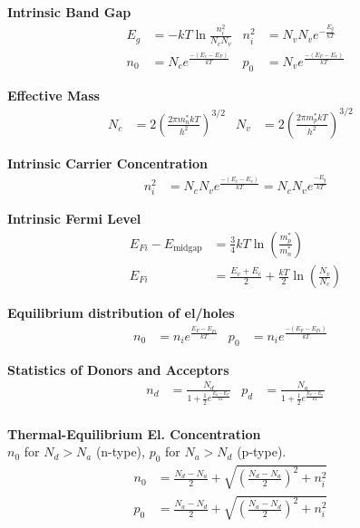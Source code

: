 \documentclass[a4paper, fontsize=8pt, landscape, DIV=1]{scrartcl}
\begin{document}
\begin{multicols*}{4}
    \textbf{Intrinsic Band Gap} \\
      \begin{align*}
        E_g &= -kT\ln\frac{n_i^2}{N_c N_v} &
        n_i^2 &= N_v N_v e^{-\frac{E_g}{kT}} \\
        n_0 &= N_ce^{\frac{-(E_c-E_F)}{kT}} &
        p_0 &= N_ve^{\frac{-(E_F-E_v)}{kT}}
      \end{align*}

    \textbf{Effective Mass} \\
      \begin{align*}
        N_c &= 2\left(\frac{2\pi m_n^*kT}{h^2}\right)^{3/2} &
        N_v &= 2\left(\frac{2\pi m_p^*kT}{h^2}\right)^{3/2} &
      \end{align*}

    \textbf{Intrinsic Carrier Concentration} \\
      \begin{align*}
        n_i^2 &= N_cN_ve^{\frac{-(E_c-E_v)}{kT}} = N_cN_ve^{\frac{-E_g}{kT}}
      \end{align*}

    \textbf{Intrinsic Fermi Level} \\
      \begin{align*}
        E_{Fi} - E_{\text{midgap}} &= \frac{3}{4}kT\ln\left(\frac{m_p^*}{m_n^*}\right) \\
        E_{Fi} &= \frac{E_v+E_c}{2} + \frac{kT}{2}\ln\left(\frac{N_v}{N_c}\right)
      \end{align*}

    \textbf{Equilibrium distribution of el/holes} \\
      \begin{align*}
        n_0 &= n_i e^{\frac{E_F-E_{Fi}}{kT}} &
        p_0 &= n_i e^{\frac{-(E_F-E_{Fi})}{kT}} &
      \end{align*}

    \textbf{Statistics of Donors and Acceptors} \\
      \begin{align*}
        n_d &= \frac{N_d}{1+\frac{1}{2}e^{\frac{E_d-E_F}{kT}}} &
        p_d &= \frac{N_a}{1+\frac{1}{2}e^{\frac{E_F-E_a}{kT}}} \\
      \end{align*}

    \textbf{Thermal-Equilibrium El. Concentration} \\
    $n_0$ for $N_d>N_a$ (n-type), $p_0$ for $N_a>N_d$ (p-type).
      \begin{align*}
        n_0 & = \frac{N_d-N_a}{2}+\sqrt{\left(\frac{N_d-N_a}{2}\right)^2+n_i^2} \\
        p_0 & = \frac{N_a-N_d}{2}+\sqrt{\left(\frac{N_a-N_d}{2}\right)^2+n_i^2} &
      \end{align*}
 

\end{multicols*}
\end{document}
